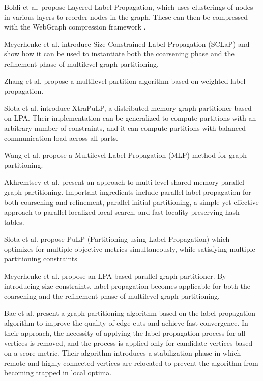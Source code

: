 {Boldi et al. \cite{boldi2011layered} propose Layered Label Propagation, which uses clusterings of nodes in various layers to reorder nodes in the graph. These can then be compressed with the WebGraph compression framework \cite{boldi2004webgraph}.

Meyerhenke et al. \cite{meyerhenke2016partitioning} introduce Size-Constrained Label Propagation (SCLaP) and show how it can be used to instantiate both the coarsening phase and the refinement phase of multilevel graph partitioning.

Zhang et al. \cite{zhang2020multilevel} propose a multilevel partition algorithm based on weighted label propagation.

Slota et al. \cite{slota2020scalable} introduce XtraPuLP, a distributed-memory graph partitioner based on LPA. Their implementation can be generalized to compute partitions with an arbitrary number of constraints, and it can compute partitions with balanced communication load across all parts.

Wang et al. \cite{wang2014partition} propose a Multilevel Label Propagation (MLP) method for graph partitioning.

Akhremtsev et al. \cite{akhremtsev2020high} present an approach to multi-level shared-memory parallel graph partitioning. Important ingredients include parallel label propagation for both coarsening and refinement, parallel initial partitioning, a simple yet effective approach to parallel localized local search, and fast locality preserving hash tables.

Slota et al. \cite{slota2014pulp} propose PuLP (Partitioning using Label Propagation) which optimizes for multiple objective metrics simultaneously, while satisfying multiple partitioning constraints

Meyerhenke et al. \cite{meyerhenke2017parallel} propose an LPA based parallel graph partitioner. By introducing size constraints, label propagation becomes applicable for both the coarsening and the refinement phase of multilevel graph partitioning.

Bae et al. \cite{bae2020label} present a graph-partitioning algorithm based on the label propagation algorithm to improve the quality of edge cuts and achieve fast convergence. In their approach, the necessity of applying the label propagation process for all vertices is removed, and the process is applied only for candidate vertices based on a score metric. Their algorithm introduces a stabilization phase in which remote and highly connected vertices are relocated to prevent the algorithm from becoming trapped in local optima.

}
